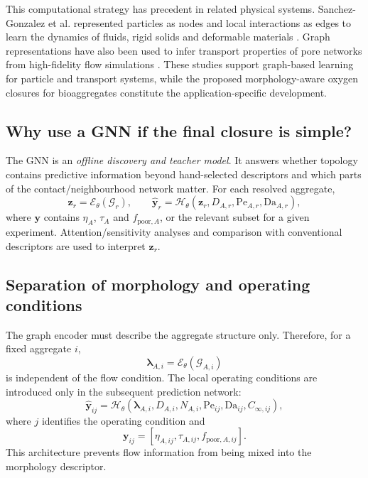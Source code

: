 \documentclass[11pt,a4paper]{article}
\newcommand{\Pe}{\mathrm{Pe}}
\newcommand{\Da}{\mathrm{Da}}
\begin{document}
This computational strategy has precedent in related physical systems.
Sanchez-Gonzalez et al. represented particles as nodes and local interactions
as edges to learn the dynamics of fluids, rigid solids and deformable
materials \cite{SanchezGonzalez2020}. Graph representations have also been
used to infer transport properties of pore networks from high-fidelity flow
simulations \cite{IAnson2025}. These studies support graph-based learning for
particle and transport systems, while the proposed morphology-aware oxygen
closures for bioaggregates constitute the application-specific development.

\subsection{Why use a GNN if the final closure is simple?}

The GNN is an \emph{offline discovery and teacher model}. It answers whether
topology contains predictive information beyond hand-selected descriptors and
which parts of the contact/neighbourhood network matter. For each resolved
aggregate,
\begin{equation}
  \boldsymbol{z}_r=\mathcal{E}_{\theta}(\mathcal{G}_r),
  \qquad
  \widehat{\boldsymbol{y}}_r=
  \mathcal{H}_{\theta}
  (\boldsymbol{z}_r,D_{A,r},\Pe_{A,r},\Da_{A,r}),
  \label{eq:gnn_teacher}
\end{equation}
where \(\boldsymbol{y}\) contains \(\eta_A\), \(\tau_A\) and
\(f_{\mathrm{poor},A}\), or the relevant subset for a given experiment.
Attention/sensitivity analyses and comparison with conventional descriptors
are used to interpret \(\boldsymbol{z}_r\).

\subsection{Separation of morphology and operating conditions}

The graph encoder must describe the aggregate structure only. Therefore, for a
fixed aggregate \(i\),
\begin{equation}
  \boldsymbol{\lambda}_{A,i}
  =\mathcal{E}_{\theta}(\mathcal{G}_{A,i})
  \label{eq:morphology_encoder}
\end{equation}
is independent of the flow condition. The local operating conditions are
introduced only in the subsequent prediction network:
\begin{equation}
  \widehat{\boldsymbol y}_{ij}
  =\mathcal{H}_{\theta}
  \left(
  \boldsymbol{\lambda}_{A,i},D_{A,i},N_{A,i},
  \Pe_{ij},\Da_{ij},C_{\infty,ij}
  \right),
  \label{eq:condition_decoder}
\end{equation}
where \(j\) identifies the operating condition and
\begin{equation}
  \boldsymbol y_{ij}
  =
  \left[
  \eta_{A,ij},\tau_{A,ij},f_{\mathrm{poor},A,ij}
  \right].
\end{equation}
This architecture prevents flow information from being mixed into the
morphology descriptor.
\end{document}
